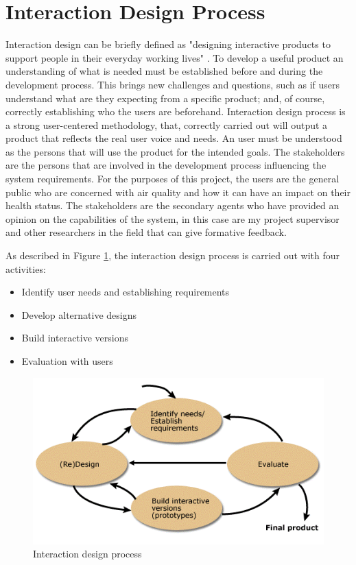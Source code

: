 \section{Interaction Design Process}
Interaction design can be briefly defined as "designing interactive products to support people in their everyday working lives" \cite{Sharp2011}. To develop a useful product an understanding of what is needed must be established before and during the development process. This brings new challenges and questions, such as if users understand what are they expecting from a specific product; and, of course, correctly establishing who the users are beforehand. Interaction design process is a strong user-centered methodology, that, correctly carried out will output a product that reflects the real user voice and needs. An user must be understood as the persons that will use the product for the intended goals. The stakeholders are the persons that are involved in the development process influencing the system requirements. For the purposes of this project, the users are the general public who are concerned with air quality and how it can have an impact on their health status. The stakeholders are the secondary agents who have provided an opinion on the capabilities of the system, in this case are my project supervisor and other researchers in the field that can give formative feedback.

As described in Figure \ref{fig:interaction_design}, the interaction design process is carried out with four activities: \begin{itemize}
  \item Identify user needs and establishing requirements
  \item Develop alternative designs
  \item Build interactive versions
  \item Evaluation with users
\end{itemize}

\begin{figure}[h]
  \includegraphics[scale=.8]{images/interatcion-design.png}
  \caption[Interaction design process]{Interaction design process \cite{Sharp2011}}
  \label{fig:interaction_design}
\end{figure}

